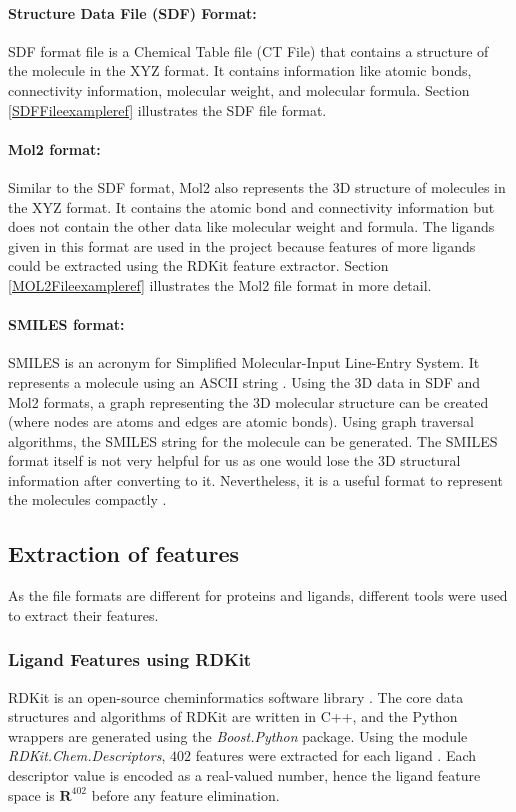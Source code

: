\documentclass[11pt]{article}
\begin{document}
\paragraph{Structure Data File (SDF) Format:}
SDF format file is a Chemical Table file (CT File) that contains a structure of the molecule in the XYZ format.
It contains information like atomic bonds,  connectivity information,  molecular weight,  and molecular formula. \cite{SDFformat}
Section \ref{SDFFileexampleref} illustrates the SDF file format.

\paragraph{Mol2 format:}
Similar to the SDF format,  Mol2 also represents the 3D structure of molecules in the XYZ format.
It contains the atomic bond and connectivity information but does not contain the other data like molecular weight and formula.
The ligands given in this format are used in the project because features of more ligands could be extracted using the RDKit feature extractor.
Section \ref{MOL2Fileexampleref} illustrates the Mol2 file format in more detail.

\paragraph{SMILES format:}
SMILES is an acronym for Simplified Molecular-Input Line-Entry System.
It represents a molecule using an ASCII string \cite{smilesformatresearchpaper}.
Using the 3D data in SDF and Mol2 formats, a graph representing the 3D molecular structure can be created (where nodes are atoms and edges are atomic bonds).
Using graph traversal algorithms, the SMILES string for the molecule can be generated.
The SMILES format itself is not very helpful for us as one would lose the 3D structural information after converting to it.
Nevertheless, it is a useful format to represent the molecules compactly
\cite{smilesformat}.

\subsection{Extraction of features}
As the file formats are different for proteins and ligands,  different tools were used to extract their features.
\subsubsection{Ligand Features using RDKit}
RDKit is an open-source cheminformatics software library \cite{rdkitofficalpage}.
The core data structures and algorithms of RDKit are written in C++, and the Python wrappers are generated using the \textit{Boost.Python} package.
Using the module \textit{RDKit.Chem.Descriptors}, $402$ features were extracted for each ligand \cite{rdkitbioinformaticsfreiburg}.
Each descriptor value is encoded as a real-valued number, hence the ligand feature space is $\mathbf{R}^{402}$ before any feature elimination.
\end{document}
